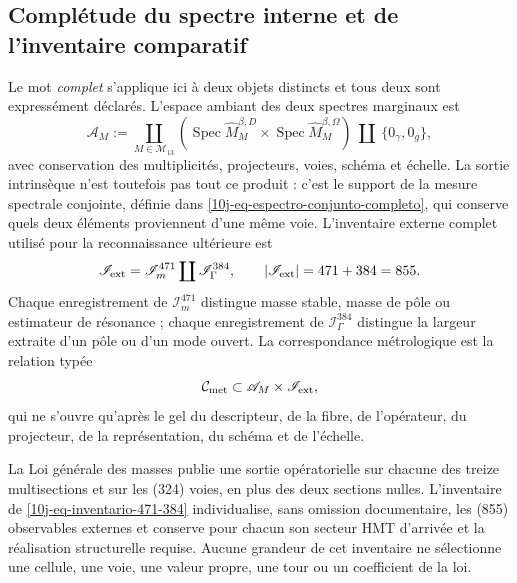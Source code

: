 \subsection{Complétude du spectre interne et de l'inventaire comparatif}

Le mot \emph{complet} s'applique ici à deux objets distincts et tous deux sont expressément déclarés. L'espace ambiant des deux spectres marginaux est
\begin{equation}
 \mathscr A_M:=
 \coprod_{M\in\mathcal M_{13}}
 \left(
  \operatorname{Spec}\widehat M_M^{\beta,D}
  \times
  \operatorname{Spec}\widehat M_M^{\beta,\Omega}
 \right)
 \ \coprod\ \{0_\gamma,0_g\},
 \label{10j-eq-espectro-interno-completo}
\end{equation}
avec conservation des multiplicités, projecteurs, voies, schéma et échelle. La sortie intrinsèque n'est toutefois pas tout ce produit : c'est le support de la mesure spectrale conjointe, définie dans \eqref{10j-eq-espectro-conjunto-completo}, qui conserve quels deux éléments proviennent d'une même voie. L'inventaire externe complet utilisé pour la reconnaissance ultérieure est
\begin{equation}
 \mathscr I_{\rm ext}
 =\mathscr I_m^{471}\coprod\mathscr I_\Gamma^{384},
 \qquad |\mathscr I_{\rm ext}|=471+384=855.
 \label{10j-eq-inventario-471-384}
\end{equation}
Chaque enregistrement de \(\mathscr I_m^{471}\) distingue masse stable, masse de pôle ou estimateur de résonance ; chaque enregistrement de \(\mathscr I_\Gamma^{384}\) distingue la largeur extraite d'un pôle ou d'un mode ouvert. La correspondance métrologique est la relation typée
\begin{equation}
 \mathcal C_{\rm met}
 \subset
 \mathscr A_M\times\mathscr I_{\rm ext},
 \label{10j-eq-correspondencia-metrologica-completa}
\end{equation}
qui ne s'ouvre qu'après le gel du descripteur, de la fibre, de l'opérateur, du projecteur, de la représentation, du schéma et de l'échelle.

\begin{theorem}
\label{10j-thm-doble-completitud}
La Loi générale des masses publie une sortie opératorielle sur chacune des treize multisections et sur les (324) voies, en plus des deux sections nulles. L'inventaire de \eqref{10j-eq-inventario-471-384} individualise, sans omission documentaire, les (855) observables externes et conserve pour chacun son secteur HMT d'arrivée et la réalisation structurelle requise. Aucune grandeur de cet inventaire ne sélectionne une cellule, une voie, une valeur propre, une tour ou un coefficient de la loi.
\end{theorem}

